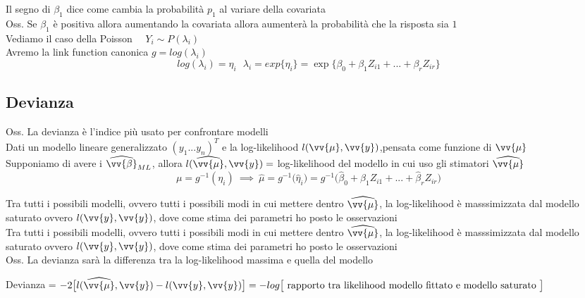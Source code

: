Il segno di $\beta_1$ dice come cambia la probabilità $p_1$ al variare della covariata\\
Oss. Se $\beta_1$ è positiva allora aumentando la covariata allora aumenterà la probabilità che la risposta sia $1$\\

Vediamo il caso della Poisson \ \ $Y_i \sim P(\lambda_i)$\\
Avremo la link function canonica $g=log(\lambda_i)$
\[
log(\lambda_i)=\eta_i \ \ \ \lambda_i = exp\{\eta_i\} = \exp\{\beta_0+\beta_1Z_{i1}+...+\beta_rZ_{ir}\}
\]


\subsection{Devianza}

Oss. La devianza è l'indice più usato per confrontare modelli\\

Dati un modello lineare generalizzato $(y_1...y_n)^T$ e la log-likelihood $l(\vv{\mu},\vv{y})$,pensata come funzione di $\vv{\mu}$\\
Supponiamo di avere i $\hat{\vv{\beta}}_{ML}$, allora $l(\hat{\vv{\mu}},\vv{y}) = $ log-likelihood del modello in cui uso gli stimatori $\hat{\vv{\mu}}$
\[
\mu=g^{-1}(\eta_i) \ \implies \ \hat{\mu}=g^{-1}\big(\hat{\eta}_i) = g^{-1}(\hat{\beta}_0+\hat{\beta}_1Z_{i1}+...+\hat{\beta}_rZ_{ir}\big)
\]


Tra tutti i possibili modelli, ovvero tutti i possibili modi in cui mettere dentro $\hat{\vv{\mu}}$, la log-likelihood è masssimizzata dal modello saturato ovvero $l(\vv{y},\vv{y})$, dove come stima dei parametri ho posto le osservazioni\\


Tra tutti i possibili modelli, ovvero tutti i possibili modi in cui mettere dentro $\hat{\vv{\mu}}$, la log-likelihood è masssimizzata dal modello saturato ovvero $l(\vv{y},\vv{y})$, dove come stima dei parametri ho posto le osservazioni\\

Oss. La devianza sarà la differenza tra la log-likelihood massima e quella del modello\\

\begin{defi}
    Devianza = $-2\big[ l(\hat{\vv{\mu}},\vv{y}) - l(\vv{y},\vv{y}) \big] = - log \big[ \text{ rapporto tra likelihood modello fittato e modello saturato } \big]$
\end{defi}
\phantom{}

